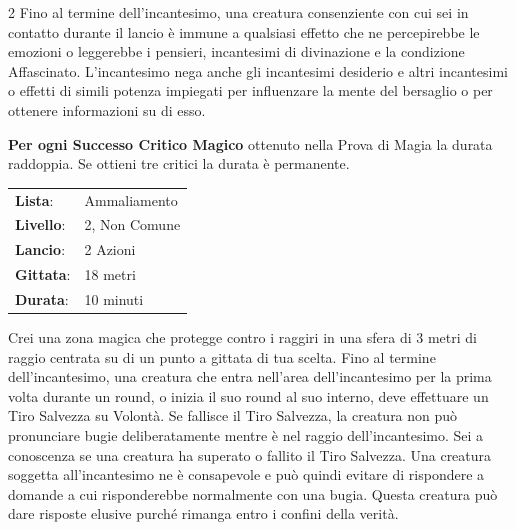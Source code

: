 \begin{multicols}{2}
Fino al termine dell'incantesimo, una creatura consenziente con cui sei in contatto durante il lancio è immune a qualsiasi effetto che ne percepirebbe le emozioni o leggerebbe i pensieri, incantesimi di divinazione e la condizione Affascinato. L'incantesimo nega anche gli incantesimi desiderio e altri incantesimi o effetti di simili potenza impiegati per
influenzare la mente del bersaglio o per ottenere informazioni su di esso.

\textbf{Per ogni Successo Critico Magico} ottenuto nella Prova di Magia la durata raddoppia. Se ottieni tre critici la durata è permanente.

\noindent\begin{tabularx}{\linewidth}{p{1.9cm}X}
	\rowcolor{gray!20}\textbf{Lista}: & Ammaliamento \\
	\textbf{Livello}: & 2, Non Comune \\
	\rowcolor{gray!20}\textbf{Lancio}: & 2 Azioni \\
	\textbf{Gittata}: & 18 metri \\
	\rowcolor{gray!20}\textbf{Durata}: & 10 minuti \\
\end{tabularx}\smallskip

Crei una zona magica che protegge contro i raggiri in una sfera di 3 metri di raggio centrata su di un punto a gittata di tua scelta. Fino al termine dell'incantesimo, una creatura che entra nell'area dell'incantesimo per la prima volta durante un round, o inizia il suo round al suo interno, deve effettuare un Tiro Salvezza su Volontà. Se fallisce il Tiro Salvezza, la creatura non può pronunciare bugie deliberatamente mentre è nel raggio dell'incantesimo. Sei a conoscenza se una creatura ha superato o fallito il Tiro Salvezza. Una creatura soggetta all'incantesimo ne è consapevole e può quindi evitare di rispondere a domande a cui risponderebbe normalmente con una bugia. Questa creatura può dare risposte elusive purché rimanga entro i confini della verità.


\bigskip


\end{multicols}


